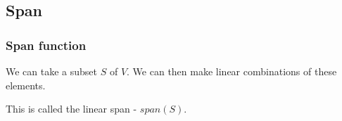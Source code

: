 
\subsection{Span}

\subsubsection{Span function}

We can take a subset \(S\) of \(V\). We can then make linear combinations of these elements.

This is called the linear span - \(span (S)\).

